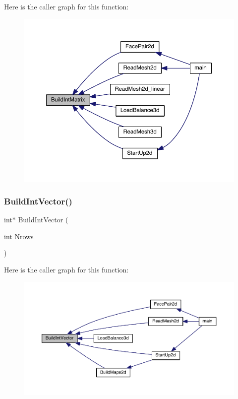 Here is the caller graph for this function\+:\nopagebreak
\begin{figure}[H]
\begin{center}
\leavevmode
\includegraphics[width=350pt]{a00554_a77f751d54b396015520a882d7a318e57_icgraph}
\end{center}
\end{figure}
\mbox{\label{a00554_a0f24d8056fa979af4888469ea90576ff}} 
\subsubsection{\texorpdfstring{Build\+Int\+Vector()}{BuildIntVector()}}
{\footnotesize\ttfamily int$\ast$ Build\+Int\+Vector (\begin{DoxyParamCaption}\item[{int}]{Nrows }\end{DoxyParamCaption})}

Here is the caller graph for this function\+:\nopagebreak
\begin{figure}[H]
\begin{center}
\leavevmode
\includegraphics[width=350pt]{a00554_a0f24d8056fa979af4888469ea90576ff_icgraph}
\end{center}
\end{figure}
\mbox{\label{a00554_ac0114aa8a9d094bad20943e1b79ba473}} 
